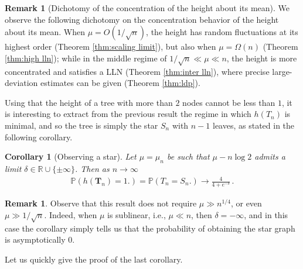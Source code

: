 \documentclass{article}
\newcommand{\pr}{\mathbb{P}}								%
\newcommand{\Prob}[1]{\pr\left(#1\right)}					%
\newcommand{\1}{\mathbbm{1}}								%
\newtheorem{corollary}[theorem]{Corollary}
\theoremstyle{definition}
\newtheorem{remark}[theorem]{Remark}
\numberwithin{equation}{section}
\newcommand{\R}{\mathbb R}
\begin{document}
\begin{remark}[Dichotomy of the concentration of the height about its mean] We observe the following dichotomy on the concentration behavior of the height about its mean. When $\mu=O( 1/\sqrt{n})$, the height has random fluctuations at its highest order (Theorem \ref{thm:scaling limit}), but also when $\mu =\Omega( n)$ (Theorem \ref{thm:high lln}); while in the middle regime of $1/\sqrt{n}\ll \mu \ll n$, the height is more concentrated and satisfies a LLN (Theorem \ref{thm:inter lln}), where precise large-deviation estimates can be given (Theorem \ref{thm:ldp}).
\end{remark}

Using that the height of a tree with more than $2$ nodes cannot be less than $1$, it is interesting to extract from the previous result the regime in which $h(T_n)$ is minimal, and so the tree is simply the star $S_n$ with $n-1$ leaves, as stated in the following corollary.

\begin{corollary}[Observing a star]\label{cor:star}
    Let $\mu=\mu_n$ be such that $\mu-n\log2$ admits a limit $\delta\in\R\cup\{\pm\infty\}$.
    Then as $n \to \infty$
    \begin{align*}
        \Prob{h(\mathbf{T}_n)=1\big.}=\Prob{T_n=S_n\big.}\longrightarrow\frac{4}{4+e^{-\delta}}\,.
    \end{align*}
\end{corollary}
\begin{remark}
    Observe that this result does not require $\mu\gg n^{1/4}$, or even $\mu\gg1/\sqrt{n}$. Indeed, when $\mu$ is sublinear, i.e., $\mu\ll n$, then $\delta=-\infty$, and in this case the corollary simply tells us that the probability of obtaining the star graph is {asymptotically} $0$. 
\end{remark}

Let us quickly give the proof of the last corollary.
\end{document}
